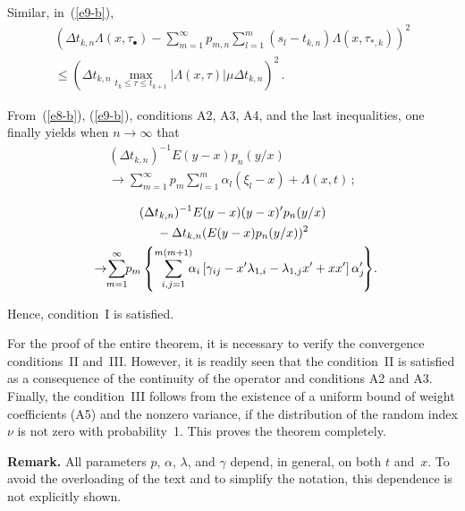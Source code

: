 \begin{multicols}{2}
Similar, in~(\ref{e9-b}),
\begin{multline*}
(\Delta t_{k,n} \Lambda (x,\tau_{\bullet } )-
\sum\limits_{m=1}^{\infty }p_{m,n}  \sum\limits_{l=1}^{m}(s_{l} -t_{k,n}  )
\Lambda (x,\tau_{*,k} ))^{2}  \\
{}\leq(\Delta t_{k,n} {\max }_{t_{k} \le \tau \le t_{k+1} } |\Lambda (x,\tau )|\mu 
\Delta t_{k,n} )^{2}\,.
\end{multline*}

From~(\ref{e8-b}), (\ref{e9-b}), conditions A2, A3, A4, and the last inequalities, one finally yields 
when $n \rightarrow \infty$ that
\begin{multline*}
(\Delta t_{k,n} )^{-1} E(y-x)p_{n} (y/x)\\
\rightarrow\sum\limits_{m=1}^{\infty }p_{m}  
\sum\limits_{l=1}^{m}\alpha_{l} (\xi_{l} -x) +\Lambda (x,t)\,;
\end{multline*}

\vspace*{-12pt}

\noindent
\begin{multline*}
(\Delta t_{k,n} )^{-1} E(y-x)(y-x)'p_{n} (y/x)\\
{}-\Delta t_{k,n} (E(y-x)p_{n} (y/x))^{2} \\
\!\rightarrow\!\!
\sum\limits_{m=1}^{\infty }\!\!
p_{m}  
\left\{ \sum\limits_{i,j=1}^{m(m+1)}\!\!\!
\alpha_{i}  \left[
\gamma_{ij} -x'\lambda_{1,i} -\lambda_{1,j} x'+xx'\right]\alpha '_{j} \!\right\}\!.\hspace*{-6.67032pt}
\end{multline*}

Hence, condition~I is satisfied.

For the proof of the entire theorem, it is necessary to verify the convergence conditions~II 
and~III. However, it is readily seen that the condition~II is satisfied as a consequence of 
the continuity of the operator and conditions A2 and A3. Finally, the condition~III follows 
from the existence of a uniform bound of weight coefficients (A5) and the nonzero variance, 
if the distribution of the random index $\nu $ is not zero with probability~1. 
This proves the theorem completely.

\smallskip

\noindent
\textbf{Remark.} All parameters $p$, $\alpha$, $\lambda$, and $\gamma$ depend, in general, 
on both $t$ and~$x$. To avoid the overloading of the text and to simplify the notation, 
this dependence is not explicitly shown.


\end{multicols}
